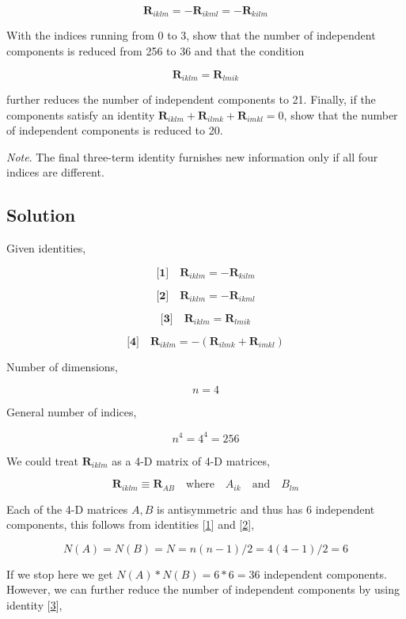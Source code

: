 \documentclass[12pt]{article}
\begin{document}
\[
    \textbf{R}_{iklm} = - \textbf{R}_{ikml} = - \textbf{R}_{kilm}
\]

With the indices running from 0 to 3, show that the number of independent components
is reduced from 256 to 36 and that the condition

\[
    \textbf{R}_{iklm} = \textbf{R}_{lmik}
\]

further reduces the number of independent components to 21. Finally, if the components
satisfy an identity \(\textbf{R}_{iklm} + \textbf{R}_{ilmk} + \textbf{R}_{imkl} = 0\),
show that the number of independent components is reduced to 20.

\textit{Note}. The final three-term identity furnishes new
information only if all four indices are different.

\subsection{Solution}

Given identities,

\[
    \label{e1} \textbf{[1]} \quad \textbf{R}_{iklm} = - \textbf{R}_{kilm}
\]

\[
    \label{e2} \textbf{[2]} \quad \textbf{R}_{iklm} = - \textbf{R}_{ikml}
\]

\[
    \label{e3} \textbf{[3]} \quad \textbf{R}_{iklm} = \textbf{R}_{lmik}
\]

\[
    \label{e4} \textbf{[4]} \quad \textbf{R}_{iklm} = - (\textbf{R}_{ilmk} + \textbf{R}_{imkl})
\]

Number of dimensions,

\[
    n = 4
\]

General number of indices,

\[
    n^4 = 4^4 = 256
\]

We could treat \(\textbf{R}_{iklm}\) as a 4-D matrix of 4-D matrices,

\[
    \textbf{R}_{iklm}
    \equiv \textbf{R}_{AB} \quad \text{where} \quad A_{ik} \quad \text{and} \quad B_{lm}
\]

Each of the 4-D matrices \(A, B\) is antisymmetric and thus has 6 independent components, this follows
from identities [\hyperref[e1]{1}] and [\hyperref[e2]{2}],

\[
    N(A) = N(B) = N = n(n-1)/2 = 4(4-1)/2 = 6
\]

If we stop here we get \(N(A) * N(B) = 6 * 6 = 36\) independent components. However, we can further reduce the number
of independent components by using identity [\hyperref[e3]{3}],
\end{document}
